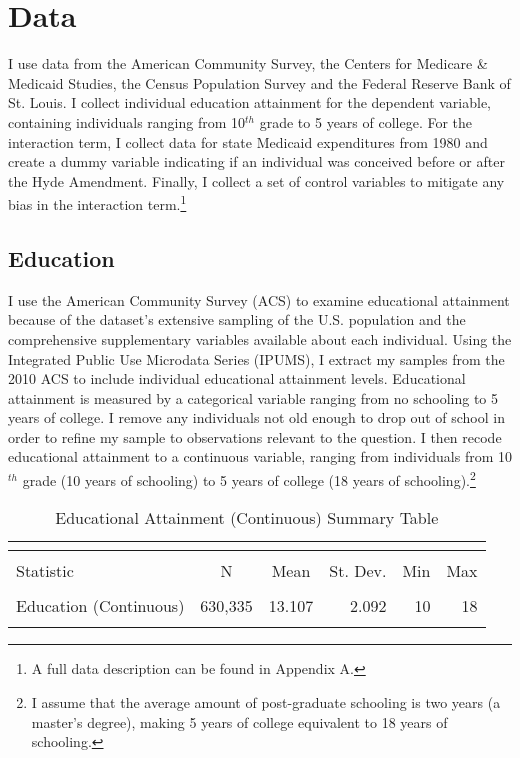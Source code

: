\section{Data}
    I use data from the American Community Survey, the Centers for Medicare \& Medicaid Studies, the Census Population Survey and the Federal Reserve Bank of St. Louis. I collect individual education attainment for the dependent variable, containing individuals ranging from 10$^{th}$ grade to 5\+ years of college. For the interaction term, I collect data for state Medicaid expenditures from 1980 and create a dummy variable indicating if an individual was conceived before or after the Hyde Amendment. Finally, I collect a set of control variables to mitigate any bias in the interaction term.\footnote{A full data description can be found in Appendix A.}

    \subsection{Education}
        I use the American Community Survey (ACS) to examine educational attainment because of the dataset's extensive sampling of the U.S. population and the comprehensive supplementary variables available about each individual. Using the Integrated Public Use Microdata Series (IPUMS), I extract my samples from the 2010 ACS to include individual educational attainment levels. Educational attainment is measured by a categorical variable ranging from no schooling to 5\+ years of college. I remove any individuals not old enough to drop out of school in order to refine my sample to observations relevant to the question. I then recode educational attainment to a continuous variable, ranging from individuals from 10$^{th}$ grade (10 years of schooling) to 5\+ years of college (18 years of schooling).\footnote{I assume that the average amount of post-graduate schooling is two years (a master's degree), making 5\+ years of college equivalent to 18 years of schooling.}

        \begingroup\small
        \begin{longtable}[h]{l|rrrrr}
        \caption{Educational Attainment (Continuous) Summary Table}  \\
        \label{edu_table}
        \\[-4ex]\hline
        \hline \\[-4ex]
        Statistic & \multicolumn{1}{c}{N} & \multicolumn{1}{c}{Mean} & \multicolumn{1}{c}{St. Dev.} & \multicolumn{1}{c}{Min} & \multicolumn{1}{c}{Max} \\
        \hline \\[-4ex]
        Education (Continuous) & 630,335 & 13.107 & 2.092 & 10 & 18\\
        \hline \\[-4ex]
        \end{longtable}
        \endgroup

